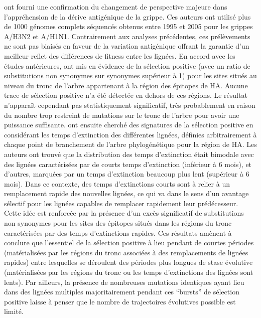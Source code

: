 \citet{Wolf2006} ont fourni une confirmation du changement de
perspective majeure dans l'appréhension de la dérive antigénique de la
grippe.  Ces auteurs ont utilisé plus de 1000 génomes complets
séquencés obtenus entre 1995 et 2005 pour les grippes A/H3N2 et
A/H1N1. Contrairement aux analyses précédentes, ces prélèvements ne
sont pas biaisés en faveur de la variation antigénique offrant la
garantie d'un meilleur reflet des différences de fitness entre les
lignées.  En accord avec les études antérieures, \citet{Wolf2006} ont
mis en évidence de la sélection positive (avec un ratio de
substitutions non synonymes sur synonymes supérieur à 1) pour les
sites situés au niveau du tronc de l'arbre appartenant à la région des
épitopes de HA.  Aucune trace de sélection positive n'a été détectée
en dehors de ces régions.  Le résultat n'apparaît cependant pas
statistiquement significatif, très probablement en raison du nombre
trop restreint de mutations sur le tronc de l'arbre pour avoir une
puissance suffisante. \citet{Wolf2006} ont ensuite cherché des
signatures de la sélection positive en considérant les temps
d'extinction des différentes lignées, définies arbitrairement à chaque
point de branchement de l'arbre phylogénétique pour la région de
HA. Les auteurs ont trouvé que la distribution des temps d'extinction
était bimodale avec des lignées caractérisées par de courts temps
d'extinction (inférieur à 6 mois), et d'autres, marquées par un temps
d'extinction beaucoup plus lent (supérieur à 6 mois). Dans ce
contexte, des temps d'extinctions courts sont à relier à un
remplacement rapide des nouvelles lignées, ce qui va dans le sens d'un
avantage sélectif pour les lignées capables de remplacer rapidement
leur prédécesseur. Cette idée est renforcée par la présence d'un excès
significatif de substitutions non synonymes pour les sites des
épitopes situés dans les régions du tronc caractérisées par des temps
d'extinctions rapides. Ces résultats amènent \citet{Wolf2006} à
conclure que l'essentiel de la sélection positive à lieu pendant de
courtes périodes (matérialisées par les régions du tronc associées à
des remplacements de lignées rapides) entre lesquelles se déroulent
des périodes plus longues de stase évolutive (matérialisées par les
régions du tronc ou les temps d'extinctions des lignées sont
lents). Par ailleurs, la présence de nombreuses mutations identiques
ayant lieu dans des lignées multiples majoritairement pendant ces
``bursts'' de sélection positive laisse à penser que le nombre de
trajectoires évolutives possible est limité.

